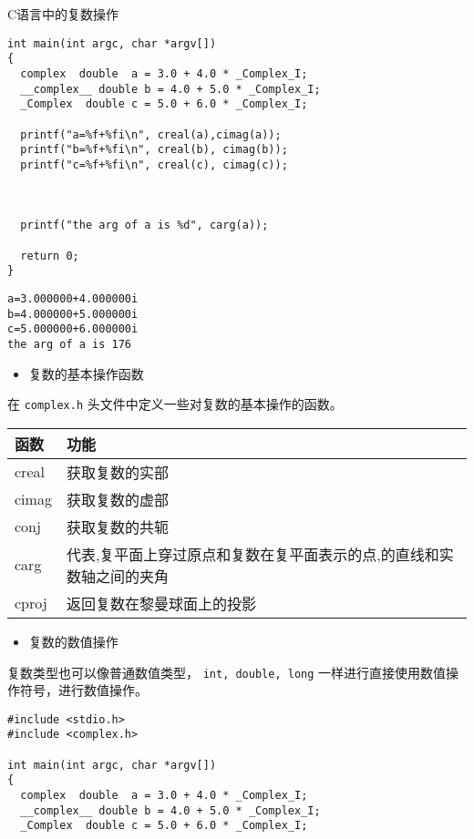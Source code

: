 \documentclass[presentation]{beamer}
\begin{document}
\begin{frame}[fragile,label={sec:org77cb714}]{}
\begin{block}{C语言中的复数操作}
\begin{verbatim}
int main(int argc, char *argv[])
{
  complex  double  a = 3.0 + 4.0 * _Complex_I;
  __complex__ double b = 4.0 + 5.0 * _Complex_I;
  _Complex  double c = 5.0 + 6.0 * _Complex_I;

  printf("a=%f+%fi\n", creal(a),cimag(a));
  printf("b=%f+%fi\n", creal(b), cimag(b));
  printf("c=%f+%fi\n", creal(c), cimag(c));



  printf("the arg of a is %d", carg(a));

  return 0;
}
\end{verbatim}

\begin{verbatim}
a=3.000000+4.000000i
b=4.000000+5.000000i
c=5.000000+6.000000i
the arg of a is 176
\end{verbatim}

\begin{itemize}
\item 复数的基本操作函数
\end{itemize}

 在 \texttt{complex.h} 头文件中定义一些对复数的基本操作的函数。


\begin{center}
\begin{tabular}{ll}
函数 & 功能\\
\hline
creal & 获取复数的实部\\
cimag & 获取复数的虚部\\
conj & 获取复数的共轭\\
carg & 代表,复平面上穿过原点和复数在复平面表示的点,的直线和实数轴之间的夹角\\
cproj & 返回复数在黎曼球面上的投影\\
\end{tabular}
\end{center}


\begin{itemize}
\item 复数的数值操作
\end{itemize}

 复数类型也可以像普通数值类型， \texttt{int, double, long} 一样进行直接使用数值操作符号，进行数值操作。

\begin{verbatim}
#include <stdio.h>
#include <complex.h>

int main(int argc, char *argv[])
{
  complex  double  a = 3.0 + 4.0 * _Complex_I;
  __complex__ double b = 4.0 + 5.0 * _Complex_I;
  _Complex  double c = 5.0 + 6.0 * _Complex_I;


\end{verbatim}
\end{block}
\end{frame}
\end{document}
